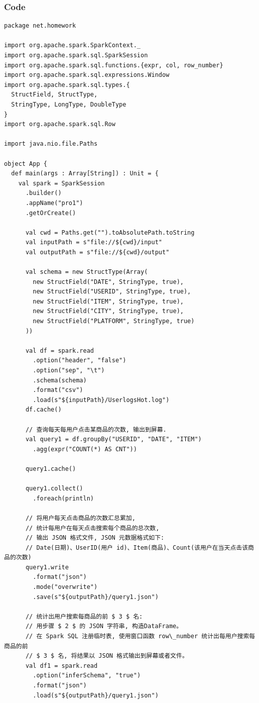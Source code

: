 \documentclass{article}
\begin{document}
\subsubsection{Code}
\begin{center}
\begin{verbatim}
package net.homework

import org.apache.spark.SparkContext._
import org.apache.spark.sql.SparkSession
import org.apache.spark.sql.functions.{expr, col, row_number}
import org.apache.spark.sql.expressions.Window
import org.apache.spark.sql.types.{
  StructField, StructType,
  StringType, LongType, DoubleType
}
import org.apache.spark.sql.Row

import java.nio.file.Paths

object App {
  def main(args : Array[String]) : Unit = {
    val spark = SparkSession
      .builder()
      .appName("pro1")
      .getOrCreate()

      val cwd = Paths.get("").toAbsolutePath.toString
      val inputPath = s"file://${cwd}/input"
      val outputPath = s"file://${cwd}/output"

      val schema = new StructType(Array(
        new StructField("DATE", StringType, true),
        new StructField("USERID", StringType, true),
        new StructField("ITEM", StringType, true),
        new StructField("CITY", StringType, true),
        new StructField("PLATFORM", StringType, true)
      ))

      val df = spark.read
        .option("header", "false")
        .option("sep", "\t")
        .schema(schema)
        .format("csv")
        .load(s"${inputPath}/UserlogsHot.log")
      df.cache()

      // 查询每天每用户点击某商品的次数, 输出到屏幕.
      val query1 = df.groupBy("USERID", "DATE", "ITEM")
        .agg(expr("COUNT(*) AS CNT"))

      query1.cache()

      query1.collect()
        .foreach(println)

      // 将用户每天点击商品的次数汇总累加,
      // 统计每用户在每天点击搜索每个商品的总次数,
      // 输出 JSON 格式文件, JSON 元数据格式如下:
      // Date(日期)、UserID(用户 id)、Item(商品)、Count(该用户在当天点击该商品的次数)
      query1.write
        .format("json")
        .mode("overwrite")
        .save(s"${outputPath}/query1.json")

      // 统计出用户搜索每商品的前 $ 3 $ 名:
      // 用步骤 $ 2 $ 的 JSON 字符串, 构造DataFrame。
      // 在 Spark SQL 注册临时表, 使用窗口函数 row\_number 统计出每用户搜索每商品的前
      // $ 3 $ 名, 将结果以 JSON 格式输出到屏幕或者文件。
      val df1 = spark.read
        .option("inferSchema", "true")
        .format("json")
        .load(s"${outputPath}/query1.json")


\end{verbatim}
\end{center}
\end{document}
